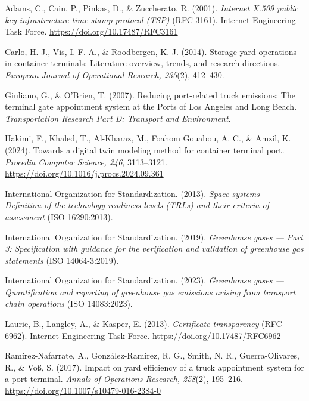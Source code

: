 \begin{list}{}{\leftmargin=1.2cm\itemindent=-1.2cm\itemsep=5pt}
  \item Adams, C., Cain, P., Pinkas, D., \& Zuccherato, R. (2001).
    \emph{Internet X.509 public key infrastructure time-stamp protocol (TSP)}
    (RFC 3161). Internet Engineering Task Force.
    \url{https://doi.org/10.17487/RFC3161}

  \item Carlo, H. J., Vis, I. F. A., \& Roodbergen, K. J. (2014). Storage yard
    operations in container terminals: Literature overview, trends, and
    research directions. \emph{European Journal of Operational Research,
    235}(2), 412--430.

  \item Giuliano, G., \& O'Brien, T. (2007). Reducing port-related truck
    emissions: The terminal gate appointment system at the Ports of Los
    Angeles and Long Beach. \emph{Transportation Research Part D: Transport
    and Environment}.

  \item Hakimi, F., Khaled, T., Al-Kharaz, M., Foahom Gouabou, A. C., \&
    Amzil, K. (2024). Towards a digital twin modeling method for container
    terminal port. \emph{Procedia Computer Science, 246}, 3113--3121.
    \url{https://doi.org/10.1016/j.procs.2024.09.361}

  \item International Organization for Standardization. (2013). \emph{Space
    systems --- Definition of the technology readiness levels (TRLs) and their
    criteria of assessment} (ISO 16290:2013).

  \item International Organization for Standardization. (2019).
    \emph{Greenhouse gases --- Part 3: Specification with guidance for the
    verification and validation of greenhouse gas statements}
    (ISO 14064-3:2019).

  \item International Organization for Standardization. (2023).
    \emph{Greenhouse gases --- Quantification and reporting of greenhouse gas
    emissions arising from transport chain operations} (ISO 14083:2023).

  \item Laurie, B., Langley, A., \& Kasper, E. (2013). \emph{Certificate
    transparency} (RFC 6962). Internet Engineering Task Force.
    \url{https://doi.org/10.17487/RFC6962}

  \item Ramírez-Nafarrate, A., González-Ramírez, R. G., Smith, N. R.,
    Guerra-Olivares, R., \& Voß, S. (2017). Impact on yard efficiency of a
    truck appointment system for a port terminal. \emph{Annals of Operations
    Research, 258}(2), 195--216.
    \url{https://doi.org/10.1007/s10479-016-2384-0}


\end{list}
